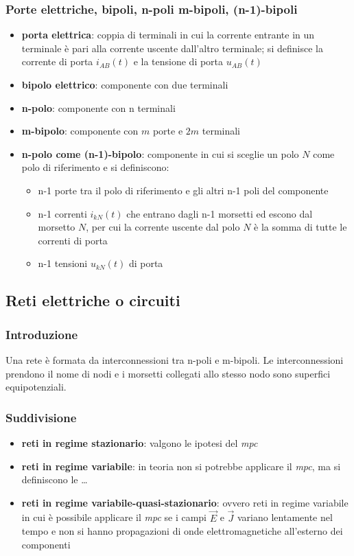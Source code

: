 \documentclass[a4paper]{article}
\begin{document}
\subsubsection*{Porte elettriche, bipoli, n-poli m-bipoli, (n-1)-bipoli}
\begin{itemize}
	\item \textbf{porta elettrica}: coppia di terminali in cui la corrente entrante in un terminale è pari alla corrente uscente
	dall'altro terminale; si definisce la corrente di porta \(i_{AB}(t)\) e la tensione di porta \(u_{AB}(t)\)
	\item \textbf{bipolo elettrico}: componente con due terminali
	\item \textbf{n-polo}: componente con n terminali
	\item \textbf{m-bipolo}: componente con \(m\) porte e \(2m\) terminali
	\item \textbf{n-polo come (n-1)-bipolo}: componente in cui si sceglie un polo \(N\) come polo di riferimento e si definiscono:
	\begin{itemize}[topsep=0pt]
		\item n-1 porte tra il polo di riferimento e gli altri n-1 poli del componente
		\item n-1 correnti \(i_{kN}(t)\) che entrano dagli n-1 morsetti ed escono dal morsetto \(N\), per cui la corrente uscente
		dal polo \(N\) è la somma di tutte le correnti di porta
		\item n-1 tensioni \(u_{kN}(t)\) di porta
	\end{itemize}
\end{itemize}

\subsection{Reti elettriche o circuiti}
\subsubsection*{Introduzione}
Una rete è formata da interconnessioni tra n-poli e m-bipoli. Le interconnessioni prendono il nome di nodi e i morsetti collegati
allo stesso nodo sono superfici equipotenziali.

\subsubsection*{Suddivisione}
\begin{itemize}
	\item \textbf{reti in regime stazionario}: valgono le ipotesi del \textit{mpc}
	\item \textbf{reti in regime variabile}: in teoria non si potrebbe applicare il \textit{mpc}, ma si definiscono le \dots
	\item \textbf{reti in regime variabile-quasi-stazionario}: ovvero reti in regime variabile in cui è possibile applicare
	il \textit{mpc} se i campi \(\vec{E}\) e \(\vec{J}\) variano lentamente nel tempo e non si hanno propagazioni di onde
	elettromagnetiche all'esterno dei componenti
\end{itemize}
\end{document}
